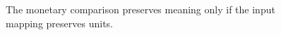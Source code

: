 \begin{figure}[H]
\centering
{}
\caption{The monetary comparison preserves meaning only if the input mapping preserves units.}\label{fig:teach-P-03d-java-delivery-03}
\end{figure}
